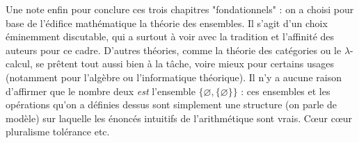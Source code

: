   \label{card}

Une note enfin pour conclure ces trois chapitres "fondationnels" : on a choisi pour base de l'édifice mathématique la théorie des ensembles. Il s'agit d'un choix éminemment discutable, qui a surtout à voir avec la tradition et l'affinité des auteurs pour ce cadre. D'autres théories, comme la théorie des catégories ou le $\lambda$-calcul, se prêtent tout aussi bien à la tâche, voire mieux pour certains usages (notamment pour l'algèbre ou l'informatique théorique). Il n'y a aucune raison d'affirmer que le nombre deux \emph{est} l'ensemble $\{\varnothing, \{\varnothing\}\}$ : ces ensembles et les opérations qu'on a définies dessus sont simplement une structure (on parle de modèle) sur laquelle les énoncés intuitifs de l'arithmétique sont vrais. Cœur cœur pluralisme tolérance etc.